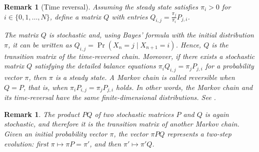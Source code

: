 \documentclass[11pt]{amsart}
\theoremstyle{plain}
\newtheorem{rem}[teo]{Remark}
\newcommand{\1}{\text{\fontseries{bx}\selectfont \textup 1}}
\begin{document}
\begin{rem}[Time reversal]
	Assuming the steady state satisfies $\pi_i>0$ for $i\in\{0,1,\dots,N\}$, define a matrix $Q$ with entries $Q_{i,j}=\frac{\pi_j}{\pi_i}P_{j,i}$.
	
	The matrix $Q$ is stochastic and, using Bayes' formula with the initial distribution $\pi$, it can be written as $Q_{i,j}=\Pr\left(X_n=j\mid X_{n+1}=i\right)$. Hence, $Q$ is the transition matrix of the time-reversed chain. Moreover, if there exists a stochastic matrix $Q$ satisfying the detailed balance equations $\pi_iQ_{i,j}=\pi_j P_{j,i}$ for a probability vector $\pi$, then $\pi$ is a steady state. A Markov chain is called reversible when $Q=P$, that is, when $\pi_iP_{i,j}=\pi_j P_{j,i}$ holds. In other words, the Markov chain and its time-reversal have the same finite-dimensional distributions. See \cite{bremaud,haggstrom}.
\end{rem}

\begin{rem}
	The product $PQ$ of two stochastic matrices $P$ and $Q$ is again stochastic, and therefore it is the transition matrix of another Markov chain. Given an initial probability vector $\pi$, the vector $\pi PQ$ represents a two-step evolution: first $\pi\mapsto \pi P=\pi'$, and then $\pi'\mapsto \pi'Q$.
\end{rem}
\end{document}
